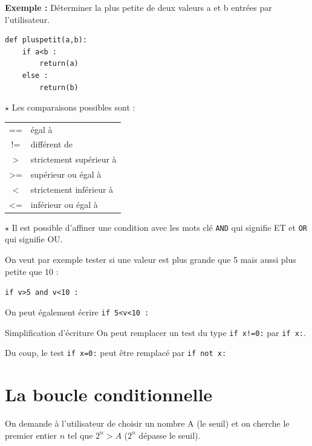 \textbf{\large Exemple :} Déterminer la plus petite de deux valeurs a et b entrées par l'utilisateur.

\begin{lstlisting}
def pluspetit(a,b):
    if a<b :
        return(a)
    else :
        return(b)
\end{lstlisting}

\begin{Rmq}[s]
$\star$ Les comparaisons possibles sont  :

\begin{center}
\begin{tabular}{c@{\hspace*{1em}:\hspace*{1em}}l}
== &égal à\\
!= &différent de\\
>  &strictement supérieur à \\
>= &supérieur ou égal à\\
<  &strictement inférieur à\\
<= &inférieur ou égal à
\end{tabular}
\end{center}

$\star$  Il est possible d'affiner une condition avec les mots clé \verb!AND! qui signifie \og ET\fg{} et \verb!OR! qui signifie \og OU\fg{}.

On veut par exemple tester si une valeur est plus grande que 5 mais aussi plus petite que 10 : 

\verb!if v>5 and v<10 :!

On peut également écrire \verb~if 5<v<10 :~
\end{Rmq}

\medskip

\begin{CadreAlgo}{\linewidth}{Simplification d'écriture}
On peut remplacer un test du type 
\verb~if x!=0:~
par \verb!if x:!.

Du coup, le test \verb!if x=0:! peut être remplacé par 
\verb!if not x:!
\end{CadreAlgo}

\section{La boucle conditionnelle}

On demande à l'utilisateur de choisir un nombre A (le seuil) et on cherche le premier entier $n$ tel que $2^n>A$ ($2^n$ dépasse le seuil).



